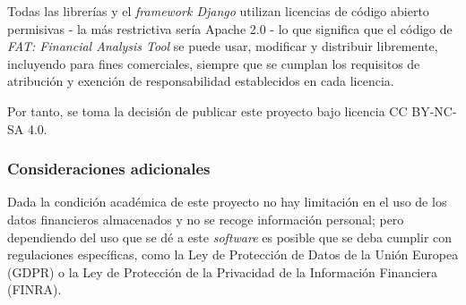 
Todas las librerías y el \emph{framework Django} utilizan licencias de código abierto permisivas - la más restrictiva sería Apache 2.0 - lo que significa que el código de \emph{FAT: Financial Analysis Tool} se puede usar, modificar y distribuir libremente, incluyendo para fines comerciales, siempre que se cumplan los requisitos de atribución y exención de responsabilidad establecidos en cada licencia.

Por tanto, se toma la decisión de publicar este proyecto bajo licencia CC BY-NC-SA 4.0\citep{online:licencia}.

\subsubsection{Consideraciones adicionales}

Dada la condición académica de este proyecto no hay limitación en el uso de los datos financieros almacenados y no se recoge información personal; pero dependiendo del uso que se dé a este \emph{software} es posible que se deba cumplir con regulaciones específicas, como la Ley de Protección de Datos de la Unión Europea (GDPR) o la Ley de Protección de la Privacidad de la Información Financiera (FINRA). 












